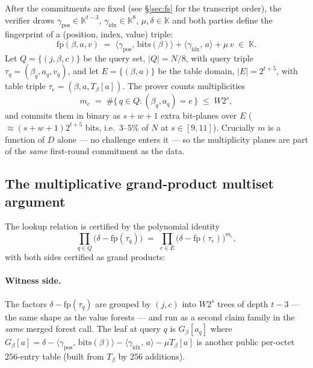 \documentclass[11pt]{article}
\theoremstyle{definition}
\newcommand{\K}{\mathbb{K}}
\newcommand{\fp}{\mathrm{fp}}
\newcommand{\ip}[2]{\langle #1,\, #2\rangle}
\begin{document}
After the commitments are fixed (see \S\ref{sec:fs} for the transcript
order), the verifier draws $\gamma_{\mathrm{pos}}\in\K^{t-3}$,
$\gamma_{\mathrm{idx}}\in\K^{8}$, $\mu,\delta\in\K$ and both parties
define the fingerprint of a (position, index, value) triple:
\[
\fp(\beta,a,v) \;=\; \ip{\gamma_{\mathrm{pos}}}{\mathrm{bits}(\beta)}
+ \ip{\gamma_{\mathrm{idx}}}{a} + \mu\, v \;\in\;\K .
\]
Let $Q=\{(j,\beta,c)\}$ be the query set, $|Q|=N/8$, with query triple
$\tau_q=(\beta_q,a_q,v_q)$, and let $E=\{(\beta,a)\}$ be the table
domain, $|E|=2^{t+5}$, with table triple $\tau_e=(\beta,a,T_\beta[a])$.
The prover counts multiplicities
\[
m_e \;=\; \#\{\,q\in Q : (\beta_q,a_q)=e\,\} \;\le\; W2^s ,
\]
and commits them in binary as $s{+}w{+}1$ extra bit-planes over $E$
($\approx (s{+}w{+}1)2^{t+5}$ bits, i.e.\ $3$--$5\%$ of $N$ at
$s\in[9,11]$). Crucially $m$ is a function of $D$ alone --- no challenge
enters it --- so the multiplicity planes are part of the \emph{same}
first-round commitment as the data.

\subsection{The multiplicative grand-product multiset argument}

The lookup relation is certified by the polynomial identity
\begin{equation}\label{eq:multiset}
\prod_{q\in Q}\bigl(\delta-\fp(\tau_q)\bigr)
\;=\;
\prod_{e\in E}\bigl(\delta-\fp(\tau_e)\bigr)^{m_e},
\end{equation}
with both sides certified as grand products:

\paragraph{Witness side.}
The factors $\delta-\fp(\tau_q)$ are grouped by $(j,c)$ into $W2^s$ trees
of depth $t-3$ --- the same shape as the value forests --- and run as a
second claim family in the \emph{same} merged forest call. The leaf at
query $q$ is $G_{\beta}[a_q]$ where
$G_\beta[a] = \delta - \ip{\gamma_{\mathrm{pos}}}{\mathrm{bits}(\beta)}
- \ip{\gamma_{\mathrm{idx}}}{a} - \mu T_\beta[a]$
is another public per-octet $256$-entry table (built from $T_\beta$ by
$256$ additions).
\end{document}

